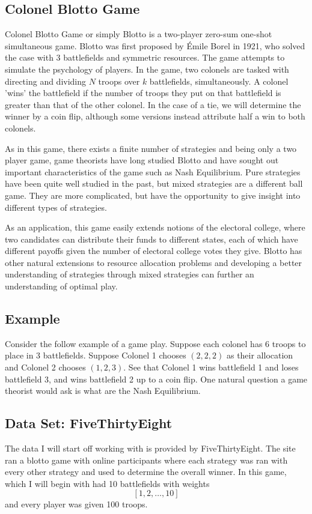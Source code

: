 \documentclass[12pt,letter]{article}
\begin{document}
\subsection{Colonel Blotto Game}
Colonel Blotto Game or simply Blotto is a two-player zero-sum one-shot simultaneous game. Blotto was first proposed by \'{E}mile Borel in 1921, who solved the case with 3 battlefields and symmetric resources. The game attempts to simulate the psychology of players. In the game, two colonels are tasked with directing and dividing $N$ troops over $k$ battlefields, simultaneously. A colonel 'wins' the battlefield if the number of troops they put on that battlefield is greater than that of the other colonel. In the case of a tie, we will determine the winner by a coin flip, although some versions instead attribute half a win to both colonels. 

As in this game, there exists a finite number of strategies and being only a two player game, game theorists have long studied Blotto and have sought out important characteristics of the game such as Nash Equilibrium. Pure strategies have been quite well studied in the past, but mixed strategies are a different ball game. They are more complicated, but have the opportunity to give insight into different types of strategies.

As an application, this game easily extends notions of the electoral college, where two candidates can distribute their funds to different states, each of which have different payoffs given the number of electoral college votes they give. Blotto has other natural extensions to resource allocation problems and developing a better understanding of strategies through mixed strategies can further an understanding of optimal play.

\subsection{Example}
Consider the follow example of a game play. Suppose each colonel has 6 troops to place in 3 battlefields. Suppose Colonel 1 chooses $(2, 2, 2)$ as their allocation and Colonel 2 chooses $(1, 2, 3)$. See that Colonel 1 wins battlefield 1 and loses battlefield 3, and wins battlefield 2 up to a coin flip. One natural question a game theorist would ask is what are the Nash Equilibrium.

\subsection{Data Set: FiveThirtyEight}
The data I will start off working with is provided by FiveThirtyEight. The site ran a blotto game with online participants where each strategy was ran with every other strategy and used to determine the overall winner. In this game, which I will begin with had 10 battlefields with weights 
\[[1, 2, \dots, 10]\]
and every player was given 100 troops.
\end{document}
